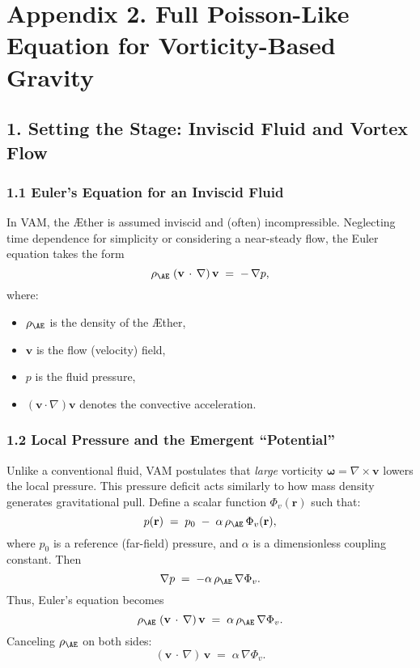 
\section*{Appendix 2. Full Poisson-Like Equation for Vorticity-Based Gravity}

\subsection*{1. Setting the Stage: Inviscid Fluid and Vortex Flow}

\subsubsection*{1.1 Euler’s Equation for an Inviscid Fluid}
In VAM, the Æther is assumed inviscid and (often) incompressible. Neglecting time dependence for simplicity or considering a near-steady flow, the Euler equation takes the form
\[
    \rho_{\mathrm{\AE}}\;(\mathbf{v}\,\cdot\,\nabla)\,\mathbf{v}
    \;=\;
    -\,\nabla p,
\]
where:
\begin{itemize}
    \item \(\rho_{\mathrm{\AE}}\) is the density of the Æther,
    \item \(\mathbf{v}\) is the flow (velocity) field,
    \item \(p\) is the fluid pressure,
    \item \((\mathbf{v}\cdot\nabla)\mathbf{v}\) denotes the convective acceleration.
\end{itemize}

\subsubsection*{1.2 Local Pressure and the Emergent “Potential”}
Unlike a conventional fluid, VAM postulates that \textit{large} vorticity \(\boldsymbol{\omega} = \nabla \times \mathbf{v}\) lowers the local pressure. This pressure deficit acts similarly to how mass density generates gravitational pull. Define a scalar function \(\Phi_v(\mathbf{r})\) such that:
\[
    p(\mathbf{r})
    \;=\;
    p_0 \;-\; \alpha \,\rho_{\mathrm{\AE}}\,\Phi_v(\mathbf{r}),
\]
where \(p_0\) is a reference (far-field) pressure, and \(\alpha\) is a dimensionless coupling constant. Then
\[
    \nabla p
    \;=\;
    -\alpha \,\rho_{\mathrm{\AE}} \,\nabla \Phi_v.
\]
Thus, Euler’s equation becomes
\[
    \rho_{\mathrm{\AE}}\;(\mathbf{v}\,\cdot\,\nabla)\,\mathbf{v}
    \;=\;
    \alpha\,\rho_{\mathrm{\AE}}\,\nabla \Phi_v.
\]
Canceling \(\rho_{\mathrm{\AE}}\) on both sides:
\[
    (\mathbf{v}\,\cdot\,\nabla)\,\mathbf{v}
    \;=\;
    \alpha\,\nabla \Phi_v.
    \tag{1}
\]

